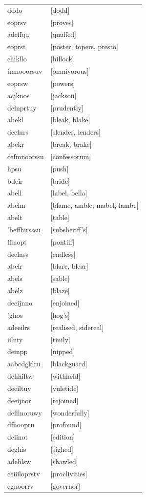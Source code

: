 \documentclass{article}
\begin{document}
\begin{tabular}{ll}
dddo & [dodd] \\
eoprsv & [proves] \\
adeffqu & [quaffed] \\
eoprst & [poster, topers, presto] \\
chikllo & [hillock] \\
imnooorsuv & [omnivorous] \\
eoprsw & [powers] \\
acjknos & [jackson] \\
delnprtuy & [prudently] \\
abekl & [bleak, blake] \\
deelnrs & [slender, lenders] \\
abekr & [break, brake] \\
cefmnoorssu & [confessorum] \\
hpsu & [push] \\
bdeir & [bride] \\
abell & [label, bella] \\
abelm & [blame, amble, mabel, lambe] \\
abelt & [table] \\
'beffhirsssu & [subsheriff's] \\
ffinopt & [pontiff] \\
deelnss & [endless] \\
abelr & [blare, blear] \\
abels & [sable] \\
abelz & [blaze] \\
deeijnno & [enjoined] \\
'ghos & [hog's] \\
adeeilrs & [realised, sidereal] \\
iilnty & [tinily] \\
deinpp & [nipped] \\
aabcdgklru & [blackguard] \\
dehhiltw & [withheld] \\
deeiltuy & [yuletide] \\
deeijnor & [rejoined] \\
defllnoruwy & [wonderfully] \\
dfnoopru & [profound] \\
deiinot & [edition] \\
deghis & [sighed] \\
adehlsw & [shawled] \\
ceiiiloprstv & [proclivities] \\
egnoorrv & [governor] \\

\end{tabular}
\end{document}
